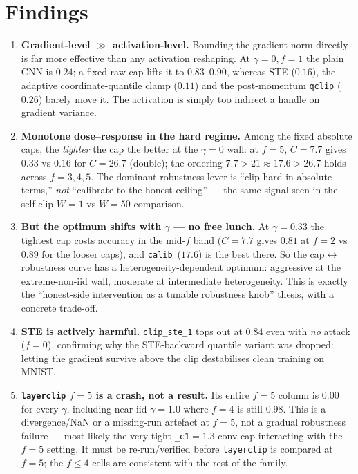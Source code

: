 \documentclass[11pt]{article}
\newcommand{\code}[1]{\texttt{#1}}
\begin{document}
\section{Findings}\label{sec:findings}
\begin{enumerate}\itemsep4pt
  \item \textbf{Gradient-level $\gg$ activation-level.} Bounding the gradient norm directly
    is far more effective than any activation reshaping. At $\gamma{=}0,f{=}1$ the plain CNN
    is $0.24$; a fixed raw cap lifts it to $0.83$--$0.90$, whereas STE ($0.16$), the adaptive
    coordinate-quantile clamp ($0.11$) and the post-momentum \code{qclip} ($0.26$) barely move
    it. The activation is simply too indirect a handle on gradient variance.
  \item \textbf{Monotone dose--response in the hard regime.} Among the fixed absolute caps,
    the \emph{tighter} the cap the better at the $\gamma{=}0$ wall: at $f{=}5$,
    $C{=}7.7$ gives $0.33$ vs $0.16$ for $C{=}26.7$ (double); the ordering
    $7.7>21\approx17.6>26.7$ holds across $f{=}3,4,5$. The dominant robustness lever is
    ``clip hard in absolute terms,'' \emph{not} ``calibrate to the honest ceiling'' --- the
    same signal seen in the self-clip $W{=}1$ vs $W{=}50$ comparison.
  \item \textbf{But the optimum shifts with $\gamma$ --- no free lunch.} At $\gamma{=}0.33$
    the tightest cap costs accuracy in the mid-$f$ band ($C{=}7.7$ gives $0.81$ at $f{=}2$
    vs $0.89$ for the looser caps), and \code{calib}~($17.6$) is the best there. So the
    cap$\leftrightarrow$robustness curve has a heterogeneity-dependent optimum: aggressive at
    the extreme-non-iid wall, moderate at intermediate heterogeneity. This is exactly the
    ``honest-side intervention as a tunable robustness knob'' thesis, with a concrete trade-off.
  \item \textbf{STE is actively harmful.} \code{clip\_ste\_1} tops out at $0.84$ even with
    \emph{no} attack ($f{=}0$), confirming why the STE-backward quantile variant was dropped:
    letting the gradient survive above the clip destabilises clean training on MNIST.
  \item \textbf{\code{layerclip} $f{=}5$ is a crash, not a result.} Its entire $f{=}5$ column
    is $0.00$ for every $\gamma$, including near-iid $\gamma{=}1.0$ where $f{=}4$ is still
    $0.98$. This is a divergence/NaN or a missing-run artefact at $f{=}5$, not a gradual
    robustness failure --- most likely the very tight \code{\_c1}$=1.3$ conv cap interacting
    with the $f{=}5$ setting. It must be re-run/verified before \code{layerclip} is compared
    at $f{=}5$; the $f\le4$ cells are consistent with the rest of the family.
\end{enumerate}
\end{document}
